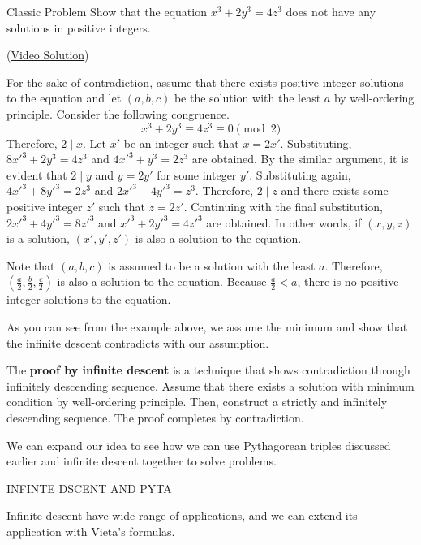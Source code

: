 \documentclass[../../../main.tex]{subfiles}
\begin{document}
\begin{problem}{Classic Problem}{}
Show that the equation $x^3 + 2y^3 = 4z^3$ does not have any
solutions in positive integers.
\end{problem}
(\href{https://youtu.be/UJR56wT0NIM}{Video Solution})
\begin{solution}
For the sake of contradiction, assume that there exists positive
integer solutions to the equation and let $(a, b, c)$ be the
solution with the least $a$ by well-ordering principle.
Consider the following congruence.
\[
x^3 + 2y^3 \equiv 4z^3 \equiv 0 \pmod{2}
\]
Therefore, $2 \mid x$. Let $x'$ be an integer such that $x = 2x'$.
Substituting, $8x'^3 + 2y^3 = 4z^3$ and $4x'^3 + y^3 = 2z^3$ are
obtained. By the similar argument, it is evident that $2 \mid y$
and $y = 2y'$ for some integer $y'$. Substituting again,
$4x'^3 + 8y'^3 = 2z^3$ and $2x'^3 + 4y'^3 = z^3$. Therefore,
$2 \mid z$ and there exists some positive integer $z'$ such that
$z = 2z'$. Continuing with the final substitution,
$2x'^3 + 4y'^3 = 8z'^3$ and $x'^3 + 2y'^3 = 4z'^3$ are obtained.
In other words, if $(x, y, z)$ is a solution, $(x', y', z')$ is
also a solution to the equation.

Note that $(a, b, c)$ is assumed to be a solution with the least $a$.
Therefore, $(\frac{a}{2}, \frac{b}{2}, \frac{c}{2})$ is also a
solution to the equation. Because $\frac{a}{2} < a$, there is no
positive integer solutions to the equation.
\end{solution}

As you can see from the example above, we assume the minimum
and show that the infinite descent contradicts with our assumption.

\begin{definition}{}{}
The \textbf{proof by infinite descent} is a technique that shows
contradiction through infinitely descending sequence. Assume that
there exists a solution with minimum condition by well-ordering
principle. Then, construct a strictly and infinitely descending
sequence. The proof completes by contradiction.
\end{definition}

We can expand our idea to see how we can use Pythagorean triples
discussed earlier and infinite descent together to solve problems.

\begin{problem}{}{}
INFINTE DSCENT AND PYTA
\end{problem}

Infinite descent have wide range of applications, and we can
extend its application with Vieta's formulas.
\end{document}
